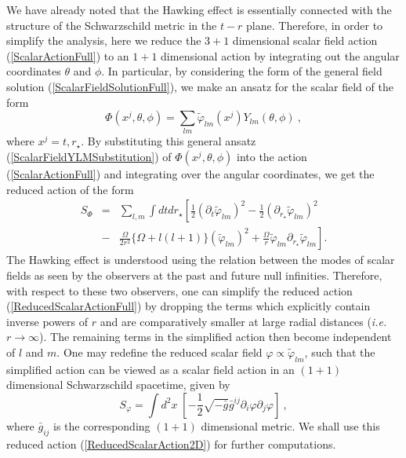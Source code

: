 \documentclass[aps,twocolumn,showpacs]{revtex4}
\def\rstar{r_{\star}}
\begin{document}
We have already noted that the Hawking effect is essentially connected with 
the structure of the Schwarzschild metric in the $t-r$ plane. Therefore, in 
order to  simplify the analysis, here we reduce the $3+1$ dimensional scalar 
field action (\ref{ScalarActionFull}) to an $1+1$ dimensional action by 
integrating out the angular coordinates $\theta$ and $\phi$. In particular, 
by considering the form of the general field solution 
(\ref{ScalarFieldSolutionFull}), we make an ansatz for the scalar field of the 
form
%
\begin{equation}\label{ScalarFieldYLMSubstitution}
\Phi(x^j,\theta,\phi) = \sum_{lm}  \tilde{\varphi}_{lm}(x^j) 
Y_{lm}(\theta,\phi) ~,
\end{equation}
%
where $x^j = t,\rstar$. By substituting this general ansatz 
(\ref{ScalarFieldYLMSubstitution})  of $\Phi(x^j,\theta,\phi)$ into the action 
(\ref{ScalarActionFull}) and integrating over the angular coordinates, we get 
the reduced action of the form
%
\begin{eqnarray}
S_{\Phi} &=& \sum_{l,m} \int dt d\rstar \left[ 
\frac{1}{2}(\partial_{t}\tilde{\varphi}_{lm})^{2}-\frac{1}{2}(\partial_{\rstar}
\tilde{\varphi}_{lm})^{2} \right. \nonumber\\
      &-& \left. \frac{\Omega}{2r^{2}}  \{\Omega+l(l+1)\} 
(\tilde{\varphi}_{lm})^{2} +\frac{\Omega}{r}
\tilde{\varphi}_{lm} \partial_{\rstar} \tilde{\varphi}_{lm}  \right].
\label{ReducedScalarActionFull}
\end{eqnarray}
%
The Hawking effect is understood using the relation between the modes of scalar 
fields as seen by the observers at the past and future null infinities. 
Therefore, with respect to these two observers, one can simplify the reduced 
action (\ref{ReducedScalarActionFull}) by dropping the terms which explicitly 
contain inverse powers of $r$ and are comparatively smaller at large radial 
distances (\emph{i.e.} $r\to\infty$). The remaining terms in the simplified 
action then become independent of $l$ and $m$. One may redefine the reduced 
scalar field $\varphi \propto \tilde{\varphi}_{lm}$, such that the simplified 
action can be viewed as a scalar field action in an $(1+1)$ dimensional 
Schwarzschild spacetime, given by
%
\begin{equation}\label{ReducedScalarAction2D}
S_{\varphi} = \int d^{2}x\;\left[ -\frac{1}{2} \sqrt{-\bar{g}} \bar{g}^{ij} 
\partial_{i}\varphi \partial_{j} \varphi \right] ~,
\end{equation}
%
where $\bar{g}_{ij}$ is the corresponding $(1+1)$ dimensional metric. We shall 
use this reduced action (\ref{ReducedScalarAction2D}) for further computations.
\end{document}
